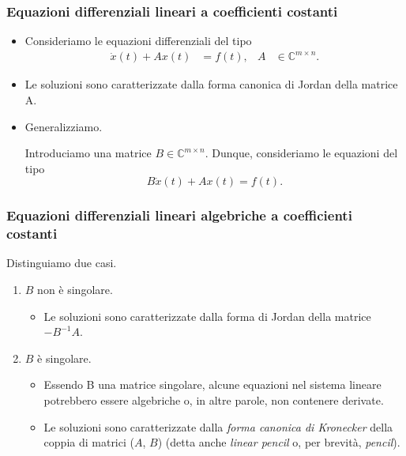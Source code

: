\begin{frame}
	\frametitle{Equazioni differenziali lineari a coefficienti costanti}
	\begin{itemize}
		\item Consideriamo le equazioni
		differenziali del tipo
		\begin{align*}
			\dot{x}(t) + Ax(t) &= f(t),& A &\in \mathbb{C}^{m \times n}.
		\end{align*}
		\item {} Le soluzioni sono caratterizzate dalla forma canonica
		di Jordan della matrice A.

		\item {} Generalizziamo.
	
		Introduciamo una matrice $B \in \mathbb{C}^{m \times n}$. Dunque, consideriamo
		le equazioni del tipo
		\[
			B\dot{x}(t) + Ax(t) = f(t).
		\]
	\end{itemize}
\end{frame}

\begin{frame}
	\frametitle{Equazioni differenziali lineari algebriche a coefficienti costanti}
	Distinguiamo due casi.
	\begin{enumerate}
		\item $B$ non \`e singolare.
		\begin{itemize}
			\item {} Le soluzioni sono caratterizzate dalla forma
			di Jordan della matrice $-B^{-1}A$.
		\end{itemize}
		\item {} $B$ \`e singolare.
		\begin{itemize}
			\item {} Essendo B una matrice singolare, alcune equazioni nel sistema lineare potrebbero
			essere algebriche o, in altre parole, non contenere derivate.
			\item {} Le soluzioni sono caratterizzate dalla \emph{forma canonica di
			Kronecker} della coppia di matrici ($A$, $B$) (detta anche \emph{linear pencil} o,
			per brevit\`a, \emph{pencil}).
		\end{itemize}
	\end{enumerate}
	
\end{frame}